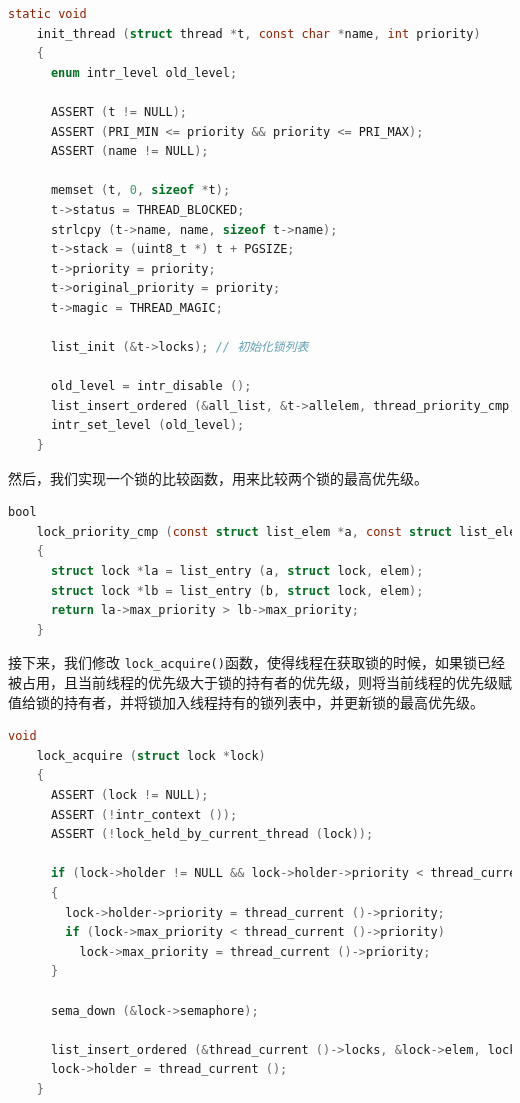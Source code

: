 \documentclass{article}
\begin{document}
\begin{lstlisting}[language=C, title=修改后的\texttt{init\_thread()}函数]
    static void
    init_thread (struct thread *t, const char *name, int priority)
    {
      enum intr_level old_level;

      ASSERT (t != NULL);
      ASSERT (PRI_MIN <= priority && priority <= PRI_MAX);
      ASSERT (name != NULL);

      memset (t, 0, sizeof *t);
      t->status = THREAD_BLOCKED;
      strlcpy (t->name, name, sizeof t->name);
      t->stack = (uint8_t *) t + PGSIZE;
      t->priority = priority;
      t->original_priority = priority;
      t->magic = THREAD_MAGIC;

      list_init (&t->locks); // 初始化锁列表

      old_level = intr_disable ();
      list_insert_ordered (&all_list, &t->allelem, thread_priority_cmp, NULL);
      intr_set_level (old_level);
    }

\end{lstlisting}

然后，我们实现一个锁的比较函数，用来比较两个锁的最高优先级。

\begin{lstlisting}[language=C, title=锁的比较函数]
    bool
    lock_priority_cmp (const struct list_elem *a, const struct list_elem *b, void *aux UNUSED)
    {
      struct lock *la = list_entry (a, struct lock, elem);
      struct lock *lb = list_entry (b, struct lock, elem);
      return la->max_priority > lb->max_priority;
    }

\end{lstlisting}

接下来，我们修改 \texttt{lock\_acquire()}函数，使得线程在获取锁的时候，如果锁已经被占用，且当前线程的优先级大于锁的持有者的优先级，则将当前线程的优先级赋值给锁的持有者，并将锁加入线程持有的锁列表中，并更新锁的最高优先级。

\begin{lstlisting}[language=C, title=修改后的\texttt{lock\_acquire()}函数]
    void
    lock_acquire (struct lock *lock)
    {
      ASSERT (lock != NULL);
      ASSERT (!intr_context ());
      ASSERT (!lock_held_by_current_thread (lock));
    
      if (lock->holder != NULL && lock->holder->priority < thread_current ()->priority)
      {
        lock->holder->priority = thread_current ()->priority;
        if (lock->max_priority < thread_current ()->priority)
          lock->max_priority = thread_current ()->priority;
      }
    
      sema_down (&lock->semaphore);
    
      list_insert_ordered (&thread_current ()->locks, &lock->elem, lock_priority_cmp, NULL);
      lock->holder = thread_current ();
    }

\end{lstlisting}
\end{document}

